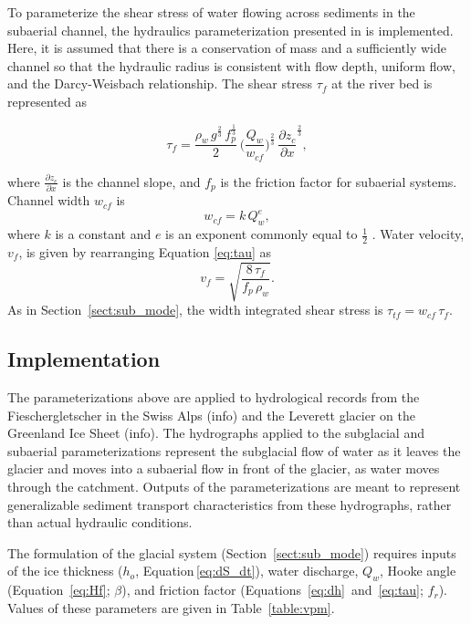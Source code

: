 \documentclass[draft]{agujournal2019}
\begin{document}
To parameterize the shear stress of water flowing across sediments in the subaerial channel,  the hydraulics parameterization presented in  is implemented.
Here, it is assumed that there is a conservation of mass and a sufficiently wide channel so that the hydraulic radius is consistent with flow depth, uniform flow, and the Darcy-Weisbach relationship.
The shear stress $\tau_f$ at the river bed is represented as
\begin{linenomath*}
  \begin{equation}
    \label{eq:DW_tau}
    \tau_f=\frac{\rho_w\,g^{\frac{2}{3}}\,f_p^{\frac{1}{3}}}{2}\, \Big(\frac{Q_w}{w_{cf}} \Big)^{\frac{2}{3}} \,\frac{\partial z_c}{\partial x}^{\frac{2}{3}},
  \end{equation}
\end{linenomath*}
where $\frac{\partial z_c}{\partial x}$ is the channel slope, and $f_p$ is the friction factor for subaerial systems.
Channel width $w_{cf}$ is 
\begin{equation}
  \label{eq:wcf}
  w_{cf} = k \, Q_w^e,
\end{equation}
% 
where $k$ is a constant and $e$ is an exponent commonly equal to $\frac{1}{2}$ \cite{leopold1953}.
Water velocity, $v_f$, is given by rearranging Equation \ref{eq:tau} as
\begin{equation}
  \label{eq:vf}
  v_f = \sqrt{\frac{8\,\tau_f}{f_p\,\rho_w}}.
\end{equation}
% 
As in Section~\ref{sect:sub_mode}, the width integrated shear stress is $\tau_{tf}=w_{cf}\,\tau_f$.

\subsection{Implementation}

The parameterizations above are applied to hydrological records from the Fieschergletscher in the Swiss Alps (info) and the Leverett glacier on the Greenland Ice Sheet (info).
The hydrographs applied to the subglacial and subaerial parameterizations represent the subglacial flow of water as it leaves the glacier and moves into a subaerial flow in front of the glacier, as water moves through the catchment.
Outputs of the parameterizations are meant to represent generalizable sediment transport characteristics from these hydrographs, rather than actual hydraulic conditions.

The formulation of the glacial system (Section~\ref{sect:sub_mode}) requires inputs of the ice thickness ($h_o$, Equation\,\ref{eq:dS_dt}), water discharge, $Q_w$,  Hooke angle (Equation~\ref{eq:Hf}; $\beta$), and friction factor (Equations~\ref{eq:dh}~and~\ref{eq:tau}; $f_r$). Values of these parameters are given in Table~\ref{table:vpm}.
\end{document}
